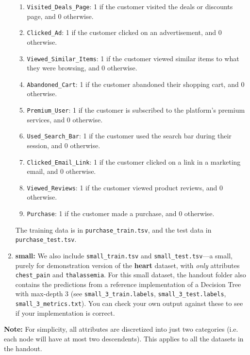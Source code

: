 \documentclass[11pt,addpoints,answers]{exam}
\begin{document}
\begin{enumerate}
\begin{enumerate}
        \item \lstinline{Visited_Deals_Page}: 1 if the customer visited the deals or discounts page, and 0 otherwise.
        \item \lstinline{Clicked_Ad}: 1 if the customer clicked on an advertisement, and 0 otherwise.
        \item \lstinline{Viewed_Similar_Items}: 1 if the customer viewed similar items to what they were browsing, and 0 otherwise.
        \item \lstinline{Abandoned_Cart}: 1 if the customer abandoned their shopping cart, and 0 otherwise.
        \item \lstinline{Premium_User}: 1 if the customer is subscribed to the platform's premium services, and 0 otherwise.
        \item \lstinline{Used_Search_Bar}: 1 if the customer used the search bar during their session, and 0 otherwise.
        \item \lstinline{Clicked_Email_Link}: 1 if the customer clicked on a link in a marketing email, and 0 otherwise.
        \item \lstinline{Viewed_Reviews}: 1 if the customer viewed product reviews, and 0 otherwise.
        \item \lstinline{Purchase}: 1 if the customer made a purchase, and 0 otherwise.
    \end{enumerate}
    The training data is in \lstinline{purchase_train.tsv}, and the test data in \lstinline{purchase_test.tsv}.
\item \textbf{small:}
    We also include \lstinline{small_train.tsv} and \lstinline{small_test.tsv}---a small, purely for demonstration version of the \textbf{heart} dataset, with \emph{only} attributes \lstinline{chest_pain} and \lstinline{thalassemia}.  
    For this small dataset, the handout folder also contains the predictions from a reference implementation of a Decision Tree with max-depth 3 (see \lstinline{small_3_train.labels}, \lstinline{small_3_test.labels}, \lstinline{small_3_metrics.txt}).
    You can check your own output against these to see if your implementation is correct.
\end{enumerate}

\begin{notebox} \textbf{Note:}
For simplicity, all attributes are discretized into just two categories (i.e. each node will have at most two descendents). This applies to all the datasets in the handout.
\end{notebox}
\end{document}
